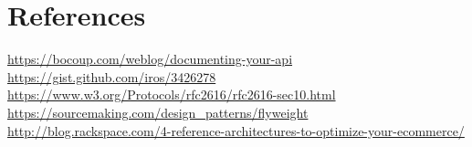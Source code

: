 \documentclass{report}
\begin{document}
\chapter{References}
\url {https://bocoup.com/weblog/documenting-your-api}\\ 
\url {https://gist.github.com/iros/3426278}\\
\url {https://www.w3.org/Protocols/rfc2616/rfc2616-sec10.html} \\
\url {https://sourcemaking.com/design_patterns/flyweight} \\
\url {http://blog.rackspace.com/4-reference-architectures-to-optimize-your-ecommerce/} \\
\end{document}
